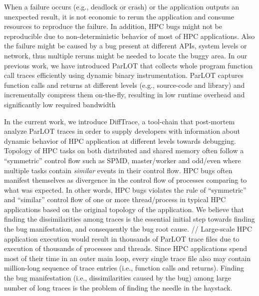 When a failure occurs (e.g., deadlock or crash) or the application outputs an unexpected result, it is not economic to rerun the application and consume resources to reproduce the failure. In addition, HPC bugs might not be reproducible due to non-deterministic behavior of most of HPC applications. Also the failure might be caused by a bug present at different APIs, system levels or network, thus multiple reruns might be needed to locate the buggy area.
In our previous work\cite{parlot}, we have introduced ParLOT that collects whole program function call traces efficiently using dynamic binary instrumentation.
%
ParLOT captures function calls and returns at different levels (e.g., source-code and library) and incrementally compress them on-the-fly, resulting in low runtime overhead and significantly low required bandwidth
%


In the current work, we introduce DiffTrace, a tool-chain that post-mortem analyze ParLOT traces in order to supply developers with information about dynamic behavior of HPC application at different levels towards debugging. 
%
Topology of HPC tasks on both distributed and shared memory often follow a ``symmetric'' control flow such as SPMD, master/worker and odd/even where multiple tasks contain \textit{similar} events in their control flow. 
%
HPC bugs often manifest themselves as divergence in the control flow of processes comparing to what was expected.
%
In other words, HPC bugs violates the rule of ``symmetric'' and ``similar'' control flow of one or more thread/process in typical HPC applications based on the original topology of the application.
%
We believe that finding the dissimilarities among traces is the essential initial step towards finding the bug manifestation, and consequently the bug root cause.
% 
//
Large-scale HPC application execution would result in thousands of ParLOT trace files due to execution of thousands of processes and threads.
%
Since HPC applications spend most of their time in an outer main loop, every single trace file also may contain million-long sequence of trace entries (i.e., function calls and returns).
%
Finding the bug manifestation (i.e., dissimilarities caused by the bug) among large number of long traces is the problem of finding the needle in the haystack.



